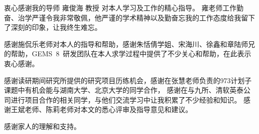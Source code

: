 
\begin{ack}

  衷心感谢我的导师 雍俊海 教授 对本人学习及工作的精心指导。
  雍老师工作勤奋、治学严谨令我非常敬佩，他严谨的学术精神以及勤奋忘我的工作态度给我留下了深刻的印象，让我终生难忘。
  
  感谢施侃乐老师对本人的指导和帮助，感谢朱恬倩学姐、宋海川、徐鑫和章陆师兄的帮助，GEMS~8~研发团队在本人求学过程中提供了不少关心和帮助，在此表示衷心感谢。
  
  感谢读研期间研究所提供的研究项目历练机会，感谢在张慧老师负责的973计划子课题中有机会能与湖南大学、北京大学的同学合作，
  感谢在与九所、清软英泰公司进行项目合作的相关同学，与他们交流学习中让我积累了不少经验和知识。
  感谢王斌老师、陈莉老师对本文的悉心评审及指导意见和建议。

  感谢家人的理解和支持。

\end{ack}
